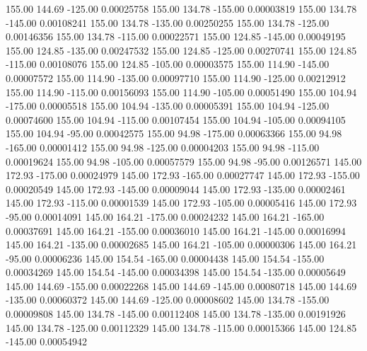     155.00    144.69   -125.00     0.00025758
    155.00    134.78   -155.00     0.00003819
    155.00    134.78   -145.00     0.00108241
    155.00    134.78   -135.00     0.00250255
    155.00    134.78   -125.00     0.00146356
    155.00    134.78   -115.00     0.00022571
    155.00    124.85   -145.00     0.00049195
    155.00    124.85   -135.00     0.00247532
    155.00    124.85   -125.00     0.00270741
    155.00    124.85   -115.00     0.00108076
    155.00    124.85   -105.00     0.00003575
    155.00    114.90   -145.00     0.00007572
    155.00    114.90   -135.00     0.00097710
    155.00    114.90   -125.00     0.00212912
    155.00    114.90   -115.00     0.00156093
    155.00    114.90   -105.00     0.00051490
    155.00    104.94   -175.00     0.00005518
    155.00    104.94   -135.00     0.00005391
    155.00    104.94   -125.00     0.00074600
    155.00    104.94   -115.00     0.00107454
    155.00    104.94   -105.00     0.00094105
    155.00    104.94    -95.00     0.00042575
    155.00     94.98   -175.00     0.00063366
    155.00     94.98   -165.00     0.00001412
    155.00     94.98   -125.00     0.00004203
    155.00     94.98   -115.00     0.00019624
    155.00     94.98   -105.00     0.00057579
    155.00     94.98    -95.00     0.00126571
    145.00    172.93   -175.00     0.00024979
    145.00    172.93   -165.00     0.00027747
    145.00    172.93   -155.00     0.00020549
    145.00    172.93   -145.00     0.00009044
    145.00    172.93   -135.00     0.00002461
    145.00    172.93   -115.00     0.00001539
    145.00    172.93   -105.00     0.00005416
    145.00    172.93    -95.00     0.00014091
    145.00    164.21   -175.00     0.00024232
    145.00    164.21   -165.00     0.00037691
    145.00    164.21   -155.00     0.00036010
    145.00    164.21   -145.00     0.00016994
    145.00    164.21   -135.00     0.00002685
    145.00    164.21   -105.00     0.00000306
    145.00    164.21    -95.00     0.00006236
    145.00    154.54   -165.00     0.00004438
    145.00    154.54   -155.00     0.00034269
    145.00    154.54   -145.00     0.00034398
    145.00    154.54   -135.00     0.00005649
    145.00    144.69   -155.00     0.00022268
    145.00    144.69   -145.00     0.00080718
    145.00    144.69   -135.00     0.00060372
    145.00    144.69   -125.00     0.00008602
    145.00    134.78   -155.00     0.00009808
    145.00    134.78   -145.00     0.00112408
    145.00    134.78   -135.00     0.00191926
    145.00    134.78   -125.00     0.00112329
    145.00    134.78   -115.00     0.00015366
    145.00    124.85   -145.00     0.00054942
